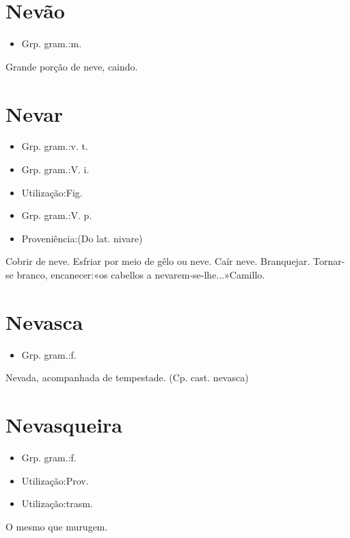 \section{Nevão}
\begin{itemize}
\item {Grp. gram.:m.}
\end{itemize}
Grande porção de neve, caindo.
\section{Nevar}
\begin{itemize}
\item {Grp. gram.:v. t.}
\end{itemize}
\begin{itemize}
\item {Grp. gram.:V. i.}
\end{itemize}
\begin{itemize}
\item {Utilização:Fig.}
\end{itemize}
\begin{itemize}
\item {Grp. gram.:V. p.}
\end{itemize}
\begin{itemize}
\item {Proveniência:(Do lat. \textunderscore nivare\textunderscore )}
\end{itemize}
Cobrir de neve.
Esfriar por meio de gêlo ou neve.
Caír neve.
Branquejar.
Tornar-se branco, encanecer:«\textunderscore os cabellos a nevarem-se-lhe...\textunderscore »Camillo.
\section{Nevasca}
\begin{itemize}
\item {Grp. gram.:f.}
\end{itemize}
Nevada, acompanhada de tempestade.
(Cp. cast. \textunderscore nevasca\textunderscore )
\section{Nevasqueira}
\begin{itemize}
\item {Grp. gram.:f.}
\end{itemize}
\begin{itemize}
\item {Utilização:Prov.}
\end{itemize}
\begin{itemize}
\item {Utilização:trasm.}
\end{itemize}
O mesmo que \textunderscore murugem\textunderscore .
